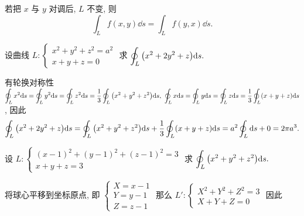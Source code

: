 \begin{theorem}[轮换对称性]
    若把 $x$ 与 $y$ 对调后, $L$ 不变, 则 $$\int_L f(x,y)\dd s=\int_Lf(y,x)\dd s.$$
\end{theorem}

\begin{example}
    设曲线 $L:\begin{cases}
            x^2+y^2+z^2=a^2 \\
            x+y+z=0
        \end{cases}$ 求 $\displaystyle\oint_L\qty(x^2+2y^2+z)\dd s.$
\end{example}
\begin{solution}
    有轮换对称性 $\displaystyle\oint_Lx^2\dd s=\oint_Ly^2\dd s=\oint_Lz^2\dd s=\dfrac{1}{3}\oint_L\qty(x^2+y^2+z^2)\dd s,~\oint_Lx\dd s=\oint_Ly\dd s=\oint_Lz\dd s=\dfrac{1}{3}\oint_L(x+y+z)\dd s$, 因此
    $$\oint_L\qty(x^2+2y^2+z)\dd s=\oint_L\qty(x^2+y^2+z^2)\dd s+\dfrac{1}{3}\oint_L(x+y+z)\dd s=a^2\oint_L\dd s+0=2\pi a^3.$$
\end{solution}

\begin{example}
    设 $L:\begin{cases}
            (x-1)^2+(y-1)^2+(z-1)^2=3 \\
            x+y+z=3
        \end{cases}$ 求 $\displaystyle\oint_L\qty(x^2+y^2+z^2)\dd s.$
\end{example}
\begin{solution}
    将球心平移到坐标原点, 即 $\begin{cases}
            X=x-1 \\
            Y=y-1 \\
            Z=z-1
        \end{cases}$ 那么 $L':\begin{cases}
            X^2+Y^2+Z^2=3 \\
            X+Y+Z=0
        \end{cases}$ 因此
\end{solution}

